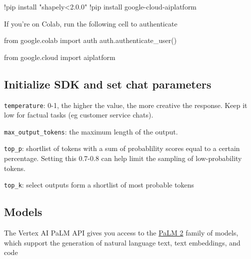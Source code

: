 \documentclass[
  letterpaper,
  DIV=11,
  numbers=noendperiod]{scrreprt}
\newenvironment{Shaded}{\begin{snugshade}}{\end{snugshade}}
\newcommand{\ImportTok}[1]{\textcolor[rgb]{0.00,0.46,0.62}{#1}}
\newcommand{\NormalTok}[1]{\textcolor[rgb]{0.00,0.23,0.31}{#1}}
\newcommand{\OperatorTok}[1]{\textcolor[rgb]{0.37,0.37,0.37}{#1}}
\newcommand{\StringTok}[1]{\textcolor[rgb]{0.13,0.47,0.30}{#1}}
\begin{document}
\begin{Shaded}
\begin{Highlighting}[]
\OperatorTok{!}\NormalTok{pip install }\StringTok{"shapely\textless{}2.0.0"}
\OperatorTok{!}\NormalTok{pip install google}\OperatorTok{{-}}\NormalTok{cloud}\OperatorTok{{-}}\NormalTok{aiplatform}
\end{Highlighting}
\end{Shaded}

If you're on Colab, run the following cell to authenticate

\begin{Shaded}
\begin{Highlighting}[]
\ImportTok{from}\NormalTok{ google.colab }\ImportTok{import}\NormalTok{ auth}
\NormalTok{auth.authenticate\_user()}
\end{Highlighting}
\end{Shaded}

\begin{Shaded}
\begin{Highlighting}[]
\ImportTok{from}\NormalTok{ google.cloud }\ImportTok{import}\NormalTok{ aiplatform}
\end{Highlighting}
\end{Shaded}

\hypertarget{initialize-sdk-and-set-chat-parameters}{%
\subsection{Initialize SDK and set chat
parameters}\label{initialize-sdk-and-set-chat-parameters}}

\texttt{temperature}: 0-1, the higher the value, the more creative the
response. Keep it low for factual tasks (eg customer service chats).

\texttt{max\_output\_tokens}: the maximum length of the output.

\texttt{top\_p}: shortlist of tokens with a sum of probablility scores
equal to a certain percentage. Setting this 0.7-0.8 can help limit the
sampling of low-probability tokens.

\texttt{top\_k}: select outputs form a shortlist of most probable tokens

\hypertarget{models}{%
\subsection{Models}\label{models}}

The Vertex AI PaLM API gives you access to the
\href{https://ai.google/discover/palm2/}{PaLM 2} family of models, which
support the generation of natural language text, text embeddings, and
code
\end{document}
